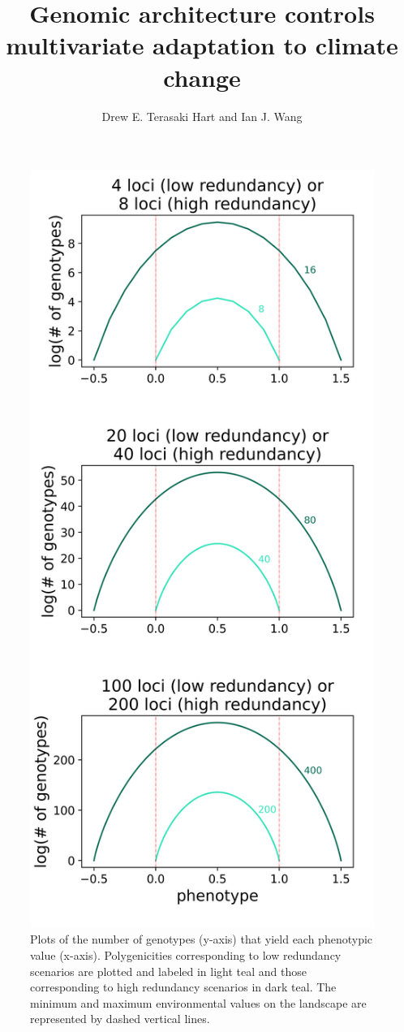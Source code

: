 \documentclass[9pt,twoside,lineno]{pnas-new}
\title{Genomic architecture controls multivariate adaptation to climate change}
\author{Drew E. Terasaki Hart and Ian J. Wang}
\begin{document}
\maketitle




\begin{figure}
\centering
\includegraphics[width=.5\linewidth]{pub/figs_and_stats/FIG_S1_redundancy.png}
\caption{Plots of the number of genotypes (y-axis) that yield each phenotypic value (x-axis). Polygenicities corresponding to low redundancy scenarios are plotted and labeled in light teal and those corresponding to high redundancy scenarios in dark teal. The minimum and maximum environmental values on the landscape are represented by dashed vertical lines.
}
\label{fig:fig_s1}
\end{figure}
\end{document}
